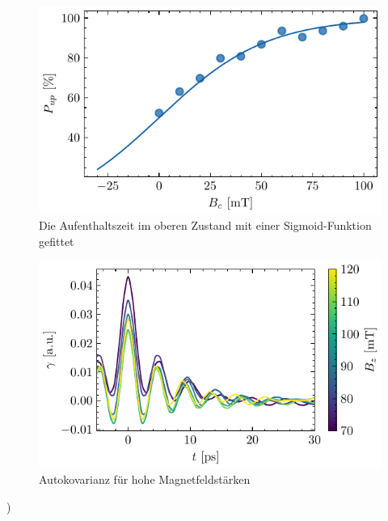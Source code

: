 \documentclass[main.tex]{subfiles}
\begin{document}
\begin{figure}[H]
    \centering
    \includegraphics{bilder/plots/max_Bz/up_percentage_fit.pdf}
    \caption{Die Aufenthaltszeit im oberen Zustand mit einer Sigmoid-Funktion gefittet }\label{fig:bz-up-percentage}
\end{figure}



\begin{figure}[H]
    \centering
    \includegraphics{bilder/plots/max_Bz/autocov_high.pdf}
    \caption{Autokovarianz für hohe Magnetfeldstärken}\label{fig:bz-autocov-high}
\end{figure})
\end{document}
